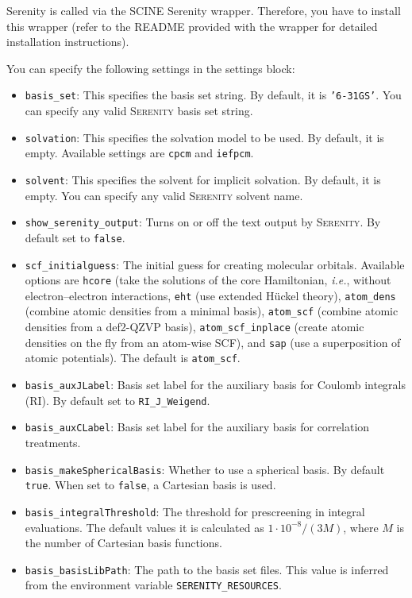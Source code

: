 \documentclass[]{tufte-book}
\begin{document}
Serenity is called via the SCINE Serenity wrapper. Therefore, you have to install this wrapper (refer to the README provided with the wrapper for
detailed installation instructions).

You can specify the following settings in the settings block:
\begin{itemize}
\item \texttt{basis\_set}: This specifies the basis set string. By default, it is \texttt{'6-31GS'}. You can specify
any valid \textsc{Serenity} basis set string.
\item \texttt{solvation}: This specifies the solvation model to be used. By default, it is empty. Available settings are \texttt{cpcm} and \texttt{iefpcm}.
\item \texttt{solvent}: This specifies the solvent for implicit solvation. By default, it is empty. You can specify any valid \textsc{Serenity} solvent name.
\item \texttt{show\_serenity\_output}: Turns on or off the text output by \textsc{Serenity}. By default set to \texttt{false}.
\item \texttt{scf\_initialguess}: The initial guess for creating molecular orbitals. Available options are \texttt{hcore} (take the solutions of the core Hamiltonian, \textit{i.e.}, without electron--electron interactions, \texttt{eht} (use extended H\"uckel theory), \texttt{atom\_dens} (combine atomic densities from a minimal basis), \texttt{atom\_scf} (combine atomic densities from a def2-QZVP basis), \texttt{atom\_scf\_inplace} (create atomic densities on the fly from an atom-wise SCF), and \texttt{sap} (use a superposition of atomic potentials). The default is \texttt{atom\_scf}.
\item \texttt{basis\_auxJLabel}: Basis set label for the auxiliary basis for Coulomb integrals (RI). By default set to \texttt{RI\_J\_Weigend}.
\item \texttt{basis\_auxCLabel}: Basis set label for the auxiliary basis for correlation treatments. 
\item \texttt{basis\_makeSphericalBasis}: Whether to use a spherical basis. By default \texttt{true}. When set to \texttt{false}, a Cartesian basis is used.
\item \texttt{basis\_integralThreshold}: The threshold for prescreening in integral evaluations. The default values it is calculated as $1\cdot 10^{-8}/(3 M)$, where $M$ is the number of Cartesian basis functions.
\item \texttt{basis\_basisLibPath}: The path to the basis set files. This value is inferred from the environment variable \texttt{SERENITY\_RESOURCES}.

\end{itemize}
\end{document}
